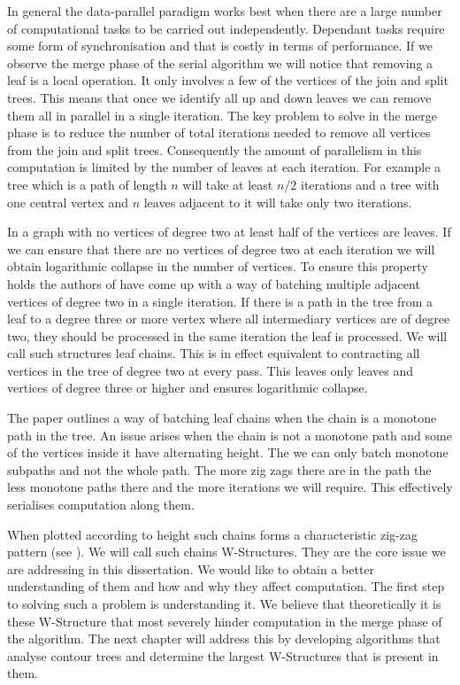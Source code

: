 In general the data-parallel paradigm works best when there are a large number of computational tasks to be carried out independently. Dependant tasks require some form of synchronisation and that is costly in terms of performance. If we observe the merge phase of the serial algorithm we will notice that removing a leaf is a local operation. It only involves a few of the vertices of the join and split trees. This means that once we identify all up and down leaves we can remove them all in parallel in a single iteration. The key problem to solve in the merge phase is to reduce the number of total iterations needed to remove all vertices from the join and split trees. Consequently the amount of parallelism in this computation is limited by the number of leaves at each iteration. For example a tree which is a path of length $n$ will take at least $n/2$ iterations and a tree with one central vertex and $n$ leaves adjacent to it will take only two iterations.

In a graph with no vertices of degree two at least half of the vertices are leaves. If we can ensure that there are no vertices of degree two at each iteration we will obtain logarithmic collapse in the number of vertices. To ensure this property holds the authors of \cite{parallel-peak-pruning} have come up with a way of batching multiple adjacent vertices of degree two in a single iteration. If there is a path in the tree from a leaf to a degree three or more vertex where all intermediary vertices are of degree two, they should be processed in the same iteration the leaf is processed. We will call such structures leaf chains. This is in effect equivalent to contracting all vertices in the tree of degree two at every pass. This leaves only leaves and vertices of degree three or higher and ensures logarithmic collapse.

The paper \cite{parallel-peak-pruning} outlines a way of batching leaf chains when the chain is a monotone path in the tree. An issue arises when the chain is not a monotone path and some of the vertices inside it have alternating height. The we can only batch monotone subpaths and not the whole path. The more zig zags there are in the path the less monotone paths there and the more iterations we will require. This effectively serialises computation along them.

When plotted according to height such chains forms a characteristic zig-zag pattern (see \cite{parallel-peak-pruning}). We will call such chains W-Structures. They are the core issue we are addressing in this dissertation. We would like to obtain a better understanding of them and how and why they affect computation. The first step to solving such a problem is understanding it. We believe that theoretically it is these W-Structure that most severely hinder computation in the merge phase of the algorithm. The next chapter will address this by developing algorithms that analyse contour trees and determine the largest W-Structures that is present in them.

